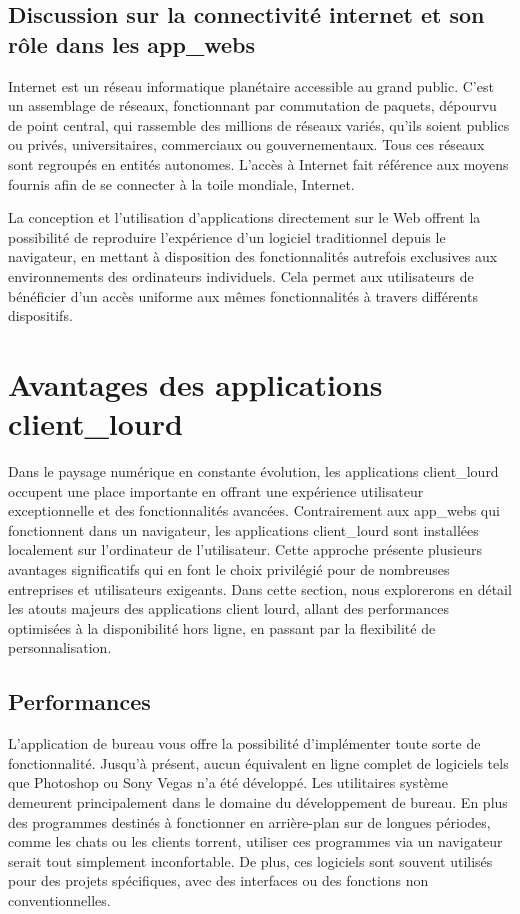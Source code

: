 \documentclass[a4paper, 12pt, french]{article}
\begin{document}
			\subsection{Discussion sur la connectivité internet et son rôle dans les \glspl{app_web}}
				Internet est un réseau informatique planétaire accessible au grand public. C'est un assemblage de réseaux, fonctionnant par commutation de paquets, dépourvu de point central, qui rassemble des millions de réseaux variés, qu'ils soient publics ou privés, universitaires, commerciaux ou gouvernementaux. Tous ces réseaux sont regroupés en entités autonomes. L'accès à Internet fait référence aux moyens fournis afin de se connecter à la toile mondiale, Internet.

				La conception et l'utilisation d'applications directement sur le Web offrent la possibilité de reproduire l'expérience d'un logiciel traditionnel depuis le navigateur, en mettant à disposition des fonctionnalités autrefois exclusives aux environnements des ordinateurs individuels. Cela permet aux utilisateurs de bénéficier d'un accès uniforme aux mêmes fonctionnalités à travers différents dispositifs.
		
		\section{Avantages des applications \gls{client_lourd}}
			Dans le paysage numérique en constante évolution, les applications \gls{client_lourd} occupent une place importante en offrant une expérience utilisateur exceptionnelle et des fonctionnalités avancées. Contrairement aux \glspl{app_web} qui fonctionnent dans un navigateur, les applications \gls{client_lourd} sont installées localement sur l'ordinateur de l'utilisateur. Cette approche présente plusieurs avantages significatifs qui en font le choix privilégié pour de nombreuses entreprises et utilisateurs exigeants. Dans cette section, nous explorerons en détail les atouts majeurs des applications client lourd, allant des performances optimisées à la disponibilité hors ligne, en passant par la flexibilité de personnalisation.
			
			\subsection{Performances}
				L'application de bureau vous offre la possibilité d'implémenter toute sorte de fonctionnalité. Jusqu'à présent, aucun équivalent en ligne complet de logiciels tels que Photoshop ou Sony Vegas n'a été développé. Les utilitaires système demeurent principalement dans le domaine du développement de bureau. En plus des programmes destinés à fonctionner en arrière-plan sur de longues périodes, comme les chats ou les clients torrent, utiliser ces programmes via un navigateur serait tout simplement inconfortable. De plus, ces logiciels sont souvent utilisés pour des projets spécifiques, avec des interfaces ou des fonctions non conventionnelles.
\end{document}
